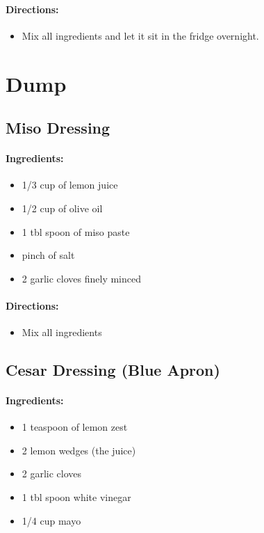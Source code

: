 \documentclass{article}
\begin{document}
\paragraph{Directions:}
\begin{itemize}
    \item Mix all ingredients and let it sit in the fridge overnight.
\end{itemize}

\section{Dump}


\subsection{Miso Dressing}

\paragraph{Ingredients:}
\begin{itemize}
    \item 1/3 cup of lemon juice
    \item 1/2 cup of olive oil
    \item 1 tbl spoon of miso paste
    \item pinch of salt
    \item 2 garlic cloves finely minced
\end{itemize}

\paragraph{Directions:}
\begin{itemize}
    \item Mix all ingredients
\end{itemize}

\subsection{Cesar Dressing (Blue Apron)}

\paragraph{Ingredients:}
\begin{itemize}
    \item 1 teaspoon of lemon zest
    \item 2 lemon wedges (the juice)
    \item 2 garlic cloves
    \item 1 tbl spoon white vinegar
    \item 1/4 cup mayo
\end{itemize}
\end{document}
